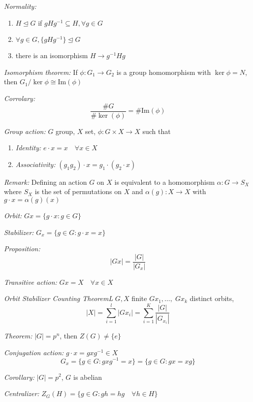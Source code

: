 \documentclass[9pt]{memoir}
\newcommand{\abs}[1]{\left\vert #1 \right\vert}
\begin{document}
\begin{multicols}{2}
    \emph{Normality:}
    \begin{enumerate}
        \item $H \trianglelefteq G$ if $gHg^{-1} \subseteq H, \forall g \in G$
        \item $\forall g\in G, \{gHg^{-1}\} \trianglelefteq G$
        \item there is an isomorphism $H \to g^{-1}Hg$
    \end{enumerate}

    \emph{Isomorphism theorem:} If $\phi: G_1 \to G_2$ is a group homomorphism with $\ker \phi = N$, then $G_1/\ker{\phi} \cong \text{Im}(\phi)$

    \emph{Corrolary:}
    \[\frac{\#G}{\#\ker(\phi)} = \#\text{Im}(\phi)\]

    \emph{Group action:} $G$ group, $X$ set, $\phi: G \times X \to X$ such that 
    \begin{enumerate}
        \item \emph{Identity:} $e \cdot x = x \quad \forall x \in X$
        \item \emph{Associativity:} $(g_1g_2) \cdot x = g_1\cdot (g_2 \cdot x)$
    \end{enumerate}

    \emph{Remark:} Defining an action $G$ on $X$ is equivalent to a homomorphism $\alpha: G \to S_X$ where $S_X$ is the set of permutations on $X$ and $\alpha(g): X \to X$ with $g\cdot x = \alpha(g)(x)$

    \emph{Orbit:} $Gx = \{g\cdot x: g \in G\}$

    \emph{Stabilizer:} $G_x = \{g \in G: g\cdot x = x\}$

    \emph{Proposition:}
    \[\abs{Gx} = \frac{\abs{G}}{\abs{G_x}}\]

    \emph{Transitive action:} $Gx = X \quad \forall x \in X$

    \emph{Orbit Stabilizer Counting TheoremL} $G, X$ finite $Gx_1, \dots, \; Gx_k$ distinct orbits, 
    \[\abs{X} = \sum_{i=1}^l \abs{Gx_i} = \sum_{i=1}^K \frac{\abs{G}}{\abs{G_{x_i}}}\]

    \emph{Theorem:} $\abs{G} = p^n$, then $Z(G) \neq \{e\}$

    \emph{Conjugation action:} $g\cdot x = gxg^{-1} \in X$ 
    \[G_x = \{g\in G: gxg^{-1} = x\} = \{g \in G: gx = xg\}\]

    \emph{Corollary:} $\abs{G} = p^2$, $G$ is abelian 

    \emph{Centralizer:} $Z_G(H) = \{g \in G: gh = hg \quad \forall h \in H\}$


\end{multicols}
\end{document}
